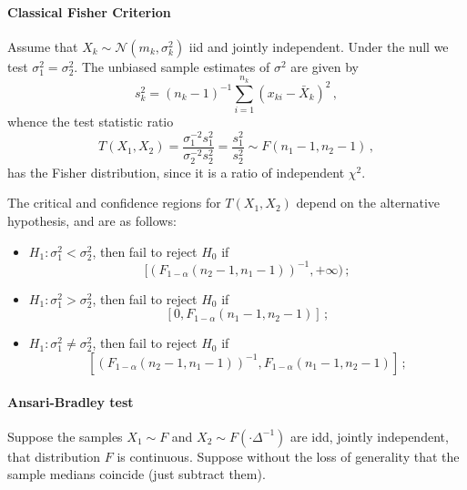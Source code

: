 \documentclass[a4paper]{article}
\newcommand{\Ncal}{\mathcal{N}}
\begin{document}
\paragraph{Classical Fisher Criterion} %
\label{par:classical_fisher_criterion}
Assume that $X_k \sim \Ncal(m_k, \sigma^2_k)$ iid and jointly independent. Under
the null we test $\sigma^2_1=\sigma^2_2$. The unbiased sample estimates of $\sigma^2$
are given by
$$ s^2_k = (n_k-1)^{-1} \sum_{i=1}^{n_k} (x_{ki} - \bar{X}_k)^2 \,,$$
whence the test statistic ratio
$$ T(X_1, X_2)
    = \frac{\sigma^{-2}_1 s^2_1}{\sigma^{-2}_2 s^2_2}
    = \frac{s^2_1}{s^2_2}
    \sim F(n_1-1, n_2-1) \,, $$
has the Fisher distribution, since it is a ratio of independent $\chi^2$.

The critical and confidence regions for $T(X_1, X_2)$ depend on the alternative
hypothesis, and are as follows: \begin{itemize}
    \item $H_1: \sigma^2_1 < \sigma^2_2$, then fail to reject $H_0$ if
    $$ [(F_{1-\alpha}(n_2-1, n_1-1))^{-1}, +\infty) \,;$$
    \item $H_1: \sigma^2_1 > \sigma^2_2$, then fail to reject $H_0$ if
    $$ [0, F_{1-\alpha}(n_1-1, n_2-1)] \,; $$
    \item $H_1: \sigma^2_1 \neq \sigma^2_2$, then fail to reject $H_0$ if
    $$ [(F_{1-\alpha}(n_2-1, n_1-1))^{-1}, F_{1-\alpha}(n_1-1, n_2-1)] \,; $$
\end{itemize}


\paragraph{Ansari-Bradley test} %
\label{par:ansari_bradley_test}
Suppose the samples $X_1\sim F$ and $X_2\sim F(\cdot\Delta^{-1})$ are idd, jointly
independent, that distribution $F$ is continuous. Suppose without the loss of generality
that the sample medians coincide (just subtract them).
\end{document}
